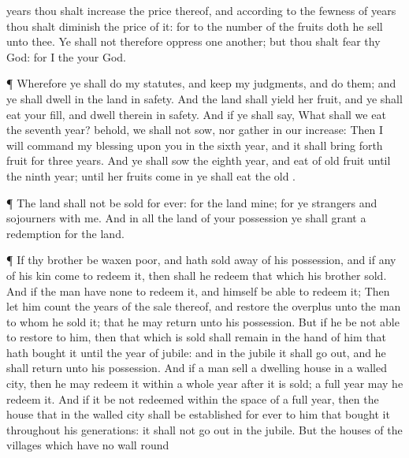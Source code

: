 {years thou shalt
increase the
price thereof, and
according to the
fewness of
years thou shalt
diminish the
price of it: for
{} to the
number
{} of the
fruits doth he
sell unto thee.
Ye shall not therefore
oppress
one
another; but thou shalt
fear thy
God: for I
{} the
{} your
God.
\par }{\PP {}¶ Wherefore ye shall
do my
statutes, and
keep my
judgments, and
do them; and ye shall
dwell in the
land in
safety.
And the
land shall
yield her
fruit, and ye shall
eat your
fill, and
dwell therein in
safety.
And if ye shall
say, What shall we
eat the
seventh
year? behold, we shall not
sow, nor
gather in our
increase:
Then I will
command my
blessing upon you in the
sixth
year, and it shall bring
forth
fruit for
three
years.
And ye shall
sow the
eighth
year, and
eat
{} of
old
fruit until the
ninth
year; until her
fruits come
in ye shall
eat
{} the
old
{}.
\par }{\PP {}¶ The
land shall not be
sold for
ever: for the
land
{} mine; for ye
{}
strangers and
sojourners with me.
And in all the
land of your
possession ye shall
grant a
redemption for the
land.
\par }{\PP {}¶ If thy
brother be waxen
poor, and hath
sold away
{} of his
possession, and if any of his
kin
come to
redeem it, then shall he
redeem that which his
brother
sold.
And if the
man have none to
redeem it, and
himself be
able to
redeem it;
Then let him
count the
years of the
sale thereof, and
restore the
overplus unto the
man to whom he
sold it; that he may
return unto his
possession.
But if
he be not
able to
restore
{} to him, then that which is
sold shall remain in the
hand of him that hath
bought it until the
year of
jubile: and in the
jubile it shall go
out, and he shall
return unto his
possession.
And if a
man
sell a
dwelling
house in a
walled
city, then he may
redeem it within a
whole
year after it is
sold;
{} a full
year may he
redeem it.
And if it be not
redeemed within the
space of a
full
year, then the
house that
{} in the
walled
city shall be
established for
ever to him that
bought it throughout his
generations: it shall not go
out in the
jubile.
But the
houses of the
villages which have no
wall round
}

